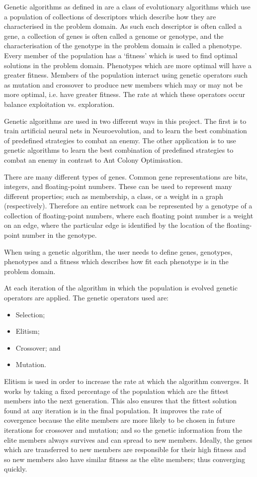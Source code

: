 Genetic algorithms as defined in \cite{ga} are a class of evolutionary algorithms which use a population of collections of descriptors which describe how they are characterised in the problem domain. As such each descriptor is often called a gene, a collection of genes is often called a genome or genotype, and the characterisation of the genotype in the problem domain is called a phenotype. Every member of the population has a `fitness' which is used to find optimal solutions in the problem domain. Phenotypes which are more optimal will have a greater fitness. Members of the population interact using genetic operators such as mutation and crossover to produce new members which may or may not be more optimal, i.e. have greater fitness. The rate at which these operators occur balance exploitation vs. exploration.

Genetic algorithms are used in two different ways in this project. The first is to train artificial neural nets in Neuroevolution, and to learn the best combination of predefined strategies to combat an enemy. The other application is to use genetic algorithms to learn the best combination of predefined strategies to combat an enemy in contrast to Ant Colony Optimisation.

There are many different types of genes. Common gene representations are bits, integers, and floating-point numbers. These can be used to represent many different properties; such as membership, a class, or a weight in a graph (respectively). Therefore an entire network can be represented by a genotype of a collection of floating-point numbers, where each floating point number is a weight on an edge, where the particular edge is identified by the location of the floating-point number in the genotype.


When using a genetic algorithm, the user needs to define genes, genotypes, phenotypes and a fitness which describes how fit each phenotype is in the problem domain. 



At each iteration of the algorithm in which the population is evolved genetic operators are applied. The genetic operators used are:
\begin{itemize}
\item Selection;
\item Elitism;
\item Crossover; and 
\item Mutation.
\end{itemize}

Elitism is used in order to increase the rate at which the algorithm converges. It works by taking a fixed percentage of the population which are the fittest members into the next generation. This also ensures that the fittest solution found at any iteration is in the final population. It improves the rate of covergence because the elite members are more likely to be chosen in future iterations for crossover and mutation; and so the genetic information from the elite members always survives and can spread to new members. Ideally, the genes which are transferred to new members are responsible for their high fitness and so new members also have similar fitness as the elite members; thus converging quickly.

